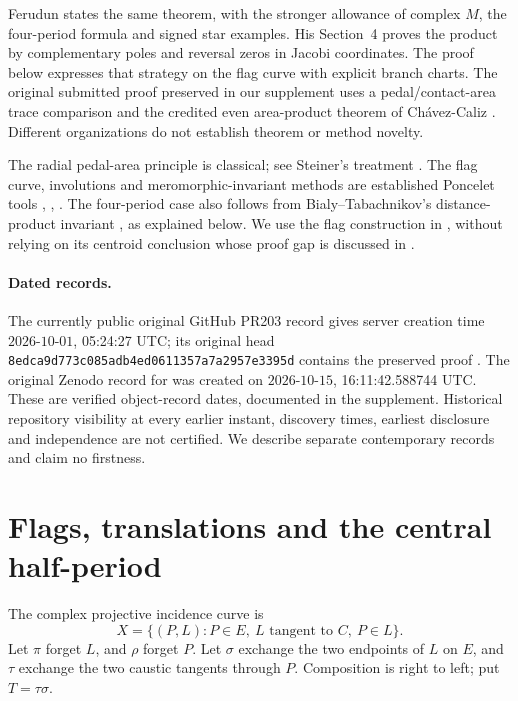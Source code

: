 \documentclass[11pt]{article}
\begin{document}
Ferudun \cite[Theorem A, p.~2]{ferudun} states the same theorem, with
the stronger allowance of complex \(M\), the four-period formula and
signed star examples. His Section~4 proves the product by complementary
poles and reversal zeros in Jacobi coordinates. The proof below expresses
that strategy on the flag curve with explicit branch charts.
The original submitted proof preserved in our supplement uses a
pedal/contact-area trace comparison and the credited even area-product
theorem of Ch\'avez-Caliz \cite{chavez}. Different organizations do not
establish theorem or method novelty.

The radial pedal-area principle is classical; see Steiner's treatment
\cite[Sections XIV--XVI, reprint pp.~18--22]{steiner}.
The flag curve, involutions and meromorphic-invariant methods are
established Poncelet tools \cite[Section~3]{schwartz},
\cite[Sections~4--5]{ast}, \cite[Section~2 and p.~104]{chavez}.
The four-period case also follows from Bialy--Tabachnikov's distance-product
invariant \cite[Theorem~4.3(2)]{bt}, as explained below.
We use the flag construction in \cite{schwartz}, without relying on its
centroid conclusion whose proof gap is discussed in \cite[p.~92]{chavez}.

\paragraph{Dated records.}
The currently public original GitHub PR203 record gives server creation
time \(2026\text{-}10\text{-}01\), 05:24:27 UTC; its original head
\texttt{8edca9d773c085adb4ed0611357a7a2957e3395d}
contains the preserved proof \cite{pr203}.
The original Zenodo record for \cite{ferudun} was created on
\(2026\text{-}10\text{-}15\), 16:11:42.588744 UTC.
These are verified object-record dates, documented in the supplement.
Historical repository visibility at every earlier instant, discovery
times, earliest disclosure and independence are not certified.
We describe separate contemporary records and claim no firstness.

\section{Flags, translations and the central half-period}
The complex projective incidence curve is
\[
 X=\{(P,L):P\in E,\ L\text{ tangent to }C,\ P\in L\}.
\]
Let \(\pi\) forget \(L\), and \(\rho\) forget \(P\).
Let \(\sigma\) exchange the two endpoints of \(L\) on \(E\), and
\(\tau\) exchange the two caustic tangents through \(P\).
Composition is right to left; put \(T=\tau\sigma\).
\end{document}
